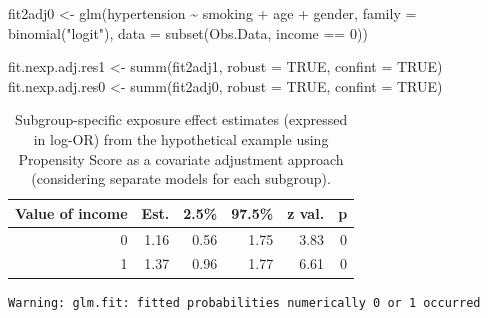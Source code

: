 \documentclass[
  letterpaper,
  DIV=11,
  numbers=noendperiod]{scrreprt}
\newenvironment{Shaded}{\begin{snugshade}}{\end{snugshade}}
\newcommand{\AttributeTok}[1]{\textcolor[rgb]{0.40,0.45,0.13}{#1}}
\newcommand{\CommentTok}[1]{\textcolor[rgb]{0.37,0.37,0.37}{#1}}
\newcommand{\ConstantTok}[1]{\textcolor[rgb]{0.56,0.35,0.01}{#1}}
\newcommand{\DecValTok}[1]{\textcolor[rgb]{0.68,0.00,0.00}{#1}}
\newcommand{\FunctionTok}[1]{\textcolor[rgb]{0.28,0.35,0.67}{#1}}
\newcommand{\NormalTok}[1]{\textcolor[rgb]{0.00,0.23,0.31}{#1}}
\newcommand{\OtherTok}[1]{\textcolor[rgb]{0.00,0.23,0.31}{#1}}
\newcommand{\SpecialCharTok}[1]{\textcolor[rgb]{0.37,0.37,0.37}{#1}}
\newcommand{\StringTok}[1]{\textcolor[rgb]{0.13,0.47,0.30}{#1}}
\begin{document}
\begin{Shaded}
\begin{Highlighting}[]
\NormalTok{fit2adj0 }\OtherTok{\textless{}{-}} \FunctionTok{glm}\NormalTok{(hypertension }\SpecialCharTok{\textasciitilde{}}\NormalTok{ smoking }\SpecialCharTok{+}\NormalTok{ age }\SpecialCharTok{+}\NormalTok{ gender, }
                \AttributeTok{family =} \FunctionTok{binomial}\NormalTok{(}\StringTok{"logit"}\NormalTok{), }
                \AttributeTok{data =} \FunctionTok{subset}\NormalTok{(Obs.Data, income }\SpecialCharTok{==} \DecValTok{0}\NormalTok{))}

\NormalTok{fit.nexp.adj.res1 }\OtherTok{\textless{}{-}} \FunctionTok{summ}\NormalTok{(fit2adj1, }\AttributeTok{robust =} \ConstantTok{TRUE}\NormalTok{, }\AttributeTok{confint =} \ConstantTok{TRUE}\NormalTok{)}
\NormalTok{fit.nexp.adj.res0 }\OtherTok{\textless{}{-}} \FunctionTok{summ}\NormalTok{(fit2adj0, }\AttributeTok{robust =} \ConstantTok{TRUE}\NormalTok{, }\AttributeTok{confint =} \ConstantTok{TRUE}\NormalTok{)}
\end{Highlighting}
\end{Shaded}

\hypertarget{tbl-cont-var}{}
\begin{table}[!h]
\caption{\label{tbl-cont-var}Subgroup-specific exposure effect estimates (expressed in log-OR) from
the hypothetical example using Propensity Score as a covariate
adjustment approach (considering separate models for each subgroup). }\tabularnewline

\centering
\begin{tabular}{rrrrrr}
\toprule
Value of income & Est. & 2.5\% & 97.5\% & z val. & p\\
\midrule
0 & 1.16 & 0.56 & 1.75 & 3.83 & 0\\
1 & 1.37 & 0.96 & 1.77 & 6.61 & 0\\
\bottomrule
\end{tabular}
\end{table}

\begin{Shaded}
\end{Shaded}

\begin{verbatim}
Warning: glm.fit: fitted probabilities numerically 0 or 1 occurred
\end{verbatim}
\end{document}
